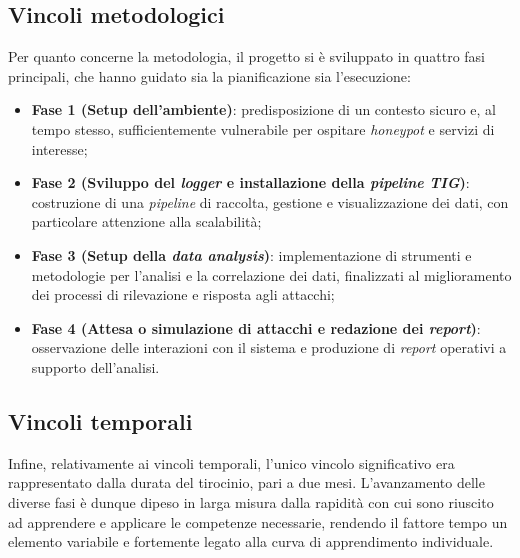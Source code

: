 \subsection{Vincoli metodologici}
Per quanto concerne la metodologia, il progetto si è sviluppato in quattro fasi principali, che hanno guidato sia la pianificazione sia l'esecuzione: 
\begin{itemize}
    \item \textbf{Fase 1 (Setup dell'ambiente)}: predisposizione di un contesto sicuro e, al tempo stesso, sufficientemente vulnerabile per ospitare \textit{honeypot} e servizi di interesse;
    \item \textbf{Fase 2 (Sviluppo del \textit{logger} e installazione della \textit{pipeline} \textit{TIG})}: costruzione di una \textit{pipeline} di raccolta, gestione e visualizzazione dei dati, con particolare attenzione alla scalabilità;
    \item \textbf{Fase 3 (Setup della \textit{data analysis})}: implementazione di strumenti e metodologie per l'analisi e la correlazione dei dati, finalizzati al miglioramento dei processi di rilevazione e risposta agli attacchi;
    \item \textbf{Fase 4 (Attesa o simulazione di attacchi e redazione dei \textit{report})}: osservazione delle interazioni con il sistema e produzione di \textit{report} operativi a supporto dell'analisi.
\end{itemize}
\subsection{Vincoli temporali}
Infine, relativamente ai vincoli temporali, l'unico vincolo significativo era rappresentato dalla durata del tirocinio, pari a due mesi. L'avanzamento delle diverse fasi è dunque dipeso in larga misura dalla rapidità con cui sono riuscito ad apprendere e applicare le competenze necessarie, rendendo il fattore tempo un elemento variabile e fortemente legato alla curva di apprendimento individuale.

